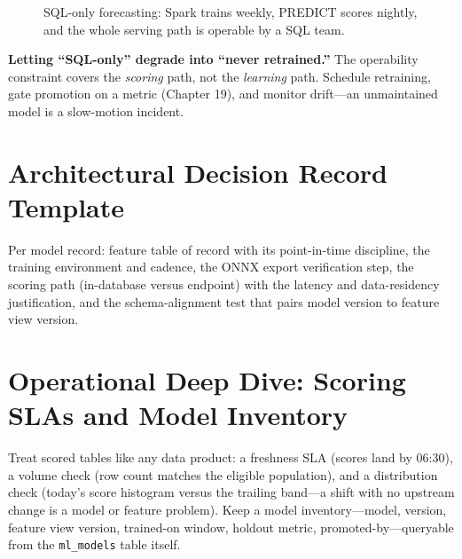 \begin{figure}[H]
    \centering
    \caption{SQL-only forecasting: Spark trains weekly, PREDICT scores nightly, and the whole serving path is operable by a SQL team.}
    \label{fig:ch17-inventory}
\end{figure}

\begin{pitfall}
\textbf{Letting ``SQL-only'' degrade into ``never retrained.''} The operability constraint covers the \emph{scoring} path, not the \emph{learning} path. Schedule retraining, gate promotion on a metric (Chapter 19), and monitor drift---an unmaintained model is a slow-motion incident.
\end{pitfall}

\section{Architectural Decision Record Template}
Per model record: feature table of record with its point-in-time discipline, the training environment and cadence, the ONNX export verification step, the scoring path (in-database versus endpoint) with the latency and data-residency justification, and the schema-alignment test that pairs model version to feature view version.

\section{Operational Deep Dive: Scoring SLAs and Model Inventory}
Treat scored tables like any data product: a freshness SLA (scores land by 06:30), a volume check (row count matches the eligible population), and a distribution check (today's score histogram versus the trailing band---a shift with no upstream change is a model or feature problem). Keep a model inventory---model, version, feature view version, trained-on window, holdout metric, promoted-by---queryable from the \texttt{ml\_models} table itself.


